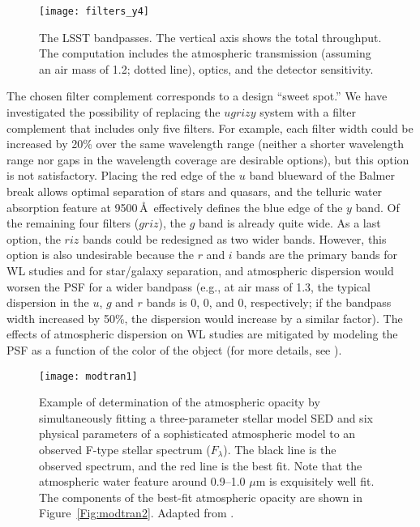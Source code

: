 \begin{figure}
\texttt{[image: filters\_y4]}
\caption{The LSST bandpasses. The vertical axis shows the total throughput. The computation
includes the atmospheric transmission (assuming an air mass of 1.2;
dotted line), optics, and the detector sensitivity.}
\label{Fig:filters}
\end{figure}

The chosen filter complement corresponds to a design ``sweet spot.'' We have
investigated the possibility of replacing the $ugrizy$ system with a
filter complement that includes only five filters. For example, each filter
width could be increased by 20\% over the same wavelength range (neither a
shorter wavelength range nor gaps in the wavelength coverage are desirable
options), but this option is not satisfactory. Placing the red edge of the $u$
band blueward of the Balmer break allows optimal separation of stars and
quasars, and the telluric water absorption feature at 9500\,\AA\
effectively defines the blue edge of the $y$ band. Of the remaining four
filters ($griz$), the $g$ band is already quite wide. As a last option, the
$riz$ bands could be redesigned as two wider bands. However, this option is also
undesirable because the $r$ and $i$ bands are the primary bands for WL
studies and for star/galaxy separation, and atmospheric dispersion
would worsen the PSF for a wider bandpass (e.g., at air mass of
1.3, the typical dispersion in the $u$, $g$ and $r$ bands is 0,
0\farcs46, and 0\farcs19, respectively; if the bandpass width increased
by 50\%, the dispersion would increase by a similar factor). The effects of
atmospheric dispersion on WL studies are mitigated by modeling
the PSF as a function of the color of the object (for more
details, see \citealt{2015ApJ...807..182M, 2018MNRAS.479.1491C}).



\begin{figure}
\texttt{[image: modtran1]}
\caption{Example of determination of the atmospheric opacity by
simultaneously fitting a three-parameter stellar model SED \citep{1979ApJS...40....1K} and
six physical parameters of a sophisticated atmospheric model \citep[MODTRAN;][]{1999SPIE.3866....2A}
to an observed F-type stellar spectrum ($F_\lambda$). The black
line is the observed spectrum, and the red line is the best fit. Note that the
atmospheric water feature around 0.9--1.0 $\mu$m is exquisitely well fit.
The components of the best-fit atmospheric opacity are shown in
Figure~\ref{Fig:modtran2}. Adapted from \citet{2010ApJ...720..811B}.}
\label{Fig:modtran1}
\end{figure}

